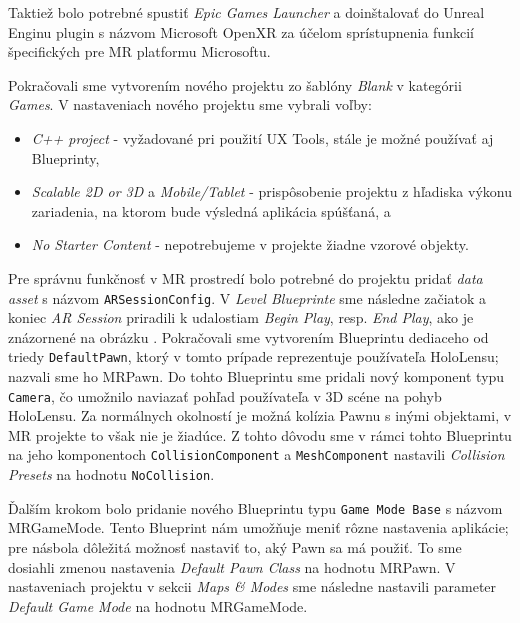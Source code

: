 Taktiež bolo potrebné spustiť \emph{Epic Games Launcher} a doinštalovať do Unreal Enginu plugin s názvom Microsoft OpenXR za účelom sprístupnenia funkcií špecifických pre MR platformu Microsoftu.

Pokračovali sme vytvorením nového projektu zo šablóny \emph{Blank} v kategórii \emph{Games}. V nastaveniach nového projektu sme vybrali voľby:
\begin{itemize}
  \item \emph{C++ project} - vyžadované pri použití UX Tools, stále je možné používať aj Blueprinty,
  \item \emph{Scalable 2D or 3D} a \emph{Mobile/Tablet} - prispôsobenie projektu z hľadiska výkonu zariadenia, na ktorom bude výsledná aplikácia spúšťaná, a
  \item \emph{No Starter Content} - nepotrebujeme v projekte žiadne vzorové objekty.
\end{itemize}

Pre správnu funkčnosť v MR prostredí bolo potrebné do projektu pridať \emph{data asset} s názvom \texttt{ARSessionConfig}. V \emph{Level Blueprinte} sme následne začiatok a koniec \emph{AR Session}
priradili k udalostiam \emph{Begin Play}, resp. \emph{End Play}, ako je znázornené na obrázku .
Pokračovali sme vytvorením Blueprintu dediaceho od triedy \texttt{DefaultPawn}, ktorý v tomto prípade reprezentuje používateľa HoloLensu; nazvali sme ho MRPawn.
Do tohto Blueprintu sme pridali nový komponent typu
\texttt{Camera}, čo umožnilo naviazať pohľad používateľa v 3D scéne na pohyb HoloLensu. Za normálnych okolností je možná kolízia Pawnu s inými objektami, v MR projekte to však nie je žiadúce.
Z tohto dôvodu sme v rámci tohto Blueprintu na jeho komponentoch \texttt{CollisionComponent} a \texttt{MeshComponent} nastavili \emph{Collision Presets} na hodnotu \texttt{NoCollision}. 

Ďalším krokom bolo pridanie nového Blueprintu typu \texttt{Game Mode Base} s názvom MRGameMode. Tento Blueprint nám umožňuje meniť rôzne nastavenia aplikácie; pre násbola dôležitá možnosť nastaviť 
to, aký Pawn sa má použiť. To sme dosiahli zmenou nastavenia \emph{Default Pawn Class} na hodnotu MRPawn. V nastaveniach projektu v sekcii \emph{Maps \& Modes} sme následne nastavili parameter
\emph{Default Game Mode} na hodnotu MRGameMode.

